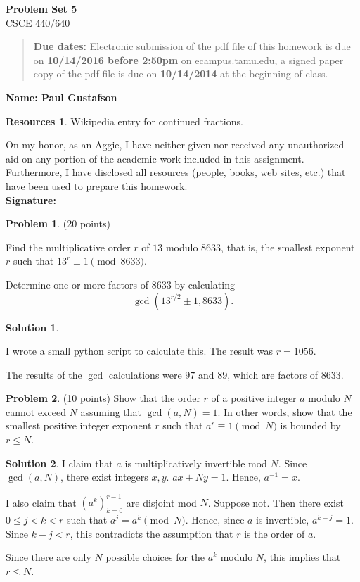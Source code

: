 \documentclass{article}
\theoremstyle{definition}
\newtheorem{problem}{Problem}
\newtheorem*{solution}{Solution}
\newtheorem*{resources}{Resources}
\newcommand{\name}[1]{\noindent\textbf{Name: #1}}
\newcommand{\honor}{\noindent On my honor, as an Aggie, I have neither
  given nor received any unauthorized aid on any portion of the
  academic work included in this assignment. Furthermore, I have
  disclosed all resources (people, books, web sites, etc.) that have
  been used to prepare this homework. \\[1ex]
 \textbf{Signature:} \underline{\hspace*{5cm}} }
\newcommand{\problemset}[1]{\begin{center}\textbf{Problem Set #1}\\ 
CSCE 440/640\end{center}}
\newcommand{\duedate}[2]{\begin{quote}\textbf{Due dates:} Electronic
    submission of the pdf file of this homework is due on \textbf{#1} on ecampus.tamu.edu, a signed paper copy
    of the pdf file is due on \textbf{#2} at the beginning of
    class. \end{quote} }
\begin{document}
\problemset{5}
\duedate{10/14/2016 before 2:50pm}{10/14/2014}
\name{ Paul Gustafson }
\begin{resources} 
Wikipedia entry for continued fractions.
\end{resources}
\honor

\newpage

\noindent 
\begin{problem} (20 points) 
\begin{compactenum}[(a)]  
\item Find the multiplicative order $r$ of $13$ modulo $8633$, that is, the smallest exponent $r$ such that $13^r\equiv 1\pmod{8633}$.
\item Determine one or more factors of $8633$ by calculating 
$$ \gcd(13^{r/2}\pm 1, 8633).$$
\end{compactenum}
\end{problem}
\begin{solution}
\begin{compactenum}[(a)]  
\item I wrote a small python script to calculate this.  The result was $r = 1056$.
\item The results of the $\gcd$ calculations were $97$ and $89$, which are factors of $8633$.
\end{compactenum}
\end{solution}

\begin{problem} (10 points) 
Show that the order $r$ of a positive integer $a$ modulo $N$ cannot exceed $N$ assuming that $\gcd(a,N)=1$. In other words, show that the smallest positive integer exponent $r$ such that $a^r\equiv 1 \pmod N$ is bounded by $r\le N$. 
\end{problem}
\begin{solution}
I claim that $a$ is multiplicatively invertible mod $N$.  Since $\gcd(a,N)$, there exist integers $x,y$.
$ax + Ny = 1$.  Hence, $a^{-1} = x$.

I also claim that $(a^k)_{k=0}^{r-1}$ are disjoint mod $N$.  Suppose not. Then there exist $0 \le j< k < r$ such that $a^j = a^k \pmod N$.  Hence, since $a$ is invertible, $a^{k-j} = 1$.  Since $k - j < r$, this contradicts the assumption that $r$ is the order of $a$.

Since there are only $N$ possible choices for the $a^k$ modulo $N$, this implies that $r \le N$.
\end{solution}
\end{document}
